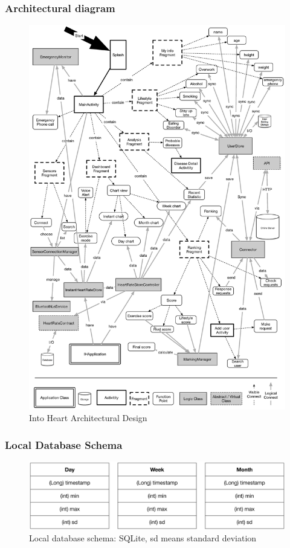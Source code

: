 \subsubsection{Architectural diagram}
\begin{figure}[H]
\centering
\includegraphics[width=5.6in]{img/arch.eps}
\caption{Into Heart Architectural Design}
\end{figure}

\subsubsection{Local Database Schema}
\begin{figure}[H]
\centering
\includegraphics[width=5.3in]{img/local_schema.eps}
\caption{Local database schema: SQLite, sd means standard deviation}
\end{figure}

